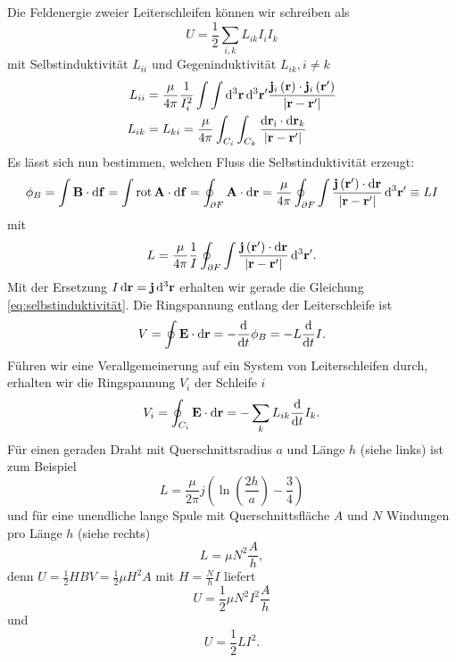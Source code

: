 Die Feldenergie zweier Leiterschleifen können wir schreiben als
\begin{equation*}
	U=\frac{1}{2}\sum _{i,k}L_{ik}I_{i}I_{k}
\end{equation*}
mit Selbstinduktivität $L_{ii}$ und Gegeninduktivität  $L_{ik},i\neq k$
\begin{align}
	\label{eq:selbstinduktivität}
	L_{ii} & =\frac{\mu }{4\pi }\frac{1}{I_{i}^{2}}\int \int \mathop{}\!\mathrm{d} ^{3}\mathbf{r}\mathop{}\!\mathrm{d} ^{3}\mathbf{r}'\frac{\mathbf{j}_{i}\left(\mathbf{r}\right)\cdot \mathbf{j}_{i}\left(\mathbf{r}'\right)}{\left| \mathbf{r}-\mathbf{r}'\right| } \\
	L_{ik} & =L_{ki}=\frac{\mu }{4\pi }\int _{C_{i}}\int _{C_{k}}\frac{\mathop{}\!\mathrm{d} \mathbf{r}_{\mathrm{i}}\cdot \mathop{}\!\mathrm{d} \mathbf{r}_{k}}{\left| \mathbf{r}-\mathbf{r}'\right| }
\end{align}
Es lässt sich nun bestimmen, welchen Fluss die Selbstinduktivität erzeugt:
\begin{equation*}
	\phi _{B}=\int \mathbf{B}\cdot \mathop{}\!\mathrm{d} \mathbf{f}=\int \operatorname{rot} \mathbf{A}\cdot \mathop{}\!\mathrm{d} \mathbf{f}=\oint _{\partial F}\mathbf{A}\cdot \mathop{}\!\mathrm{d} \mathbf{r}=\frac{\mu }{4\pi }\oint _{\partial F}\int \frac{\mathbf{j}\left(\mathbf{r}'\right)\cdot \mathop{}\!\mathrm{d} \mathbf{r}}{\left| \mathbf{r}-\mathbf{r}'\right| }\mathop{}\!\mathrm{d} ^{3}\mathbf{r}'\equiv LI
\end{equation*}
mit
\begin{equation*}
	L=\frac{\mu }{4\pi }\frac{1}{I}\oint _{\partial F}\int \frac{\mathbf{j}\left(\mathbf{r}'\right)\cdot \mathop{}\!\mathrm{d} \mathbf{r}}{\left| \mathbf{r}-\mathbf{r}'\right| }\mathop{}\!\mathrm{d} ^{3}\mathbf{r}'.
\end{equation*}
Mit der Ersetzung $I\mathop{}\!\mathrm{d} \mathbf{r}=\mathbf{j}\mathop{}\!\mathrm{d} ^{3}\mathbf{r}$ erhalten wir gerade die Gleichung \eqref{eq:selbstinduktivität}. Die Ringspannung entlang der Leiterschleife ist
\begin{equation*}
	V=\oint \mathbf{E}\cdot \mathop{}\!\mathrm{d} \mathbf{r}=-\frac{\mathop{}\!\mathrm{d} }{\mathop{}\!\mathrm{d} t}\phi _{B}=-L\frac{\mathop{}\!\mathrm{d} }{\mathop{}\!\mathrm{d} t}I.
\end{equation*}
Führen wir eine Verallgemeinerung auf ein System von Leiterschleifen durch, erhalten wir die Ringspannung $V_{i}$ der Schleife $i$
\begin{equation*}
	V_{i}=\oint _{C_{i}}\mathbf{E}\cdot \mathop{}\!\mathrm{d} \mathbf{r}=-\sum _{k}L_{ik}\frac{\mathop{}\!\mathrm{d} }{\mathop{}\!\mathrm{d} t}I_{k}.
\end{equation*}
Für einen geraden Draht mit Querschnittsradius $a$ und Länge $h$ (siehe  links) ist zum Beispiel
\begin{equation*}
	L=\frac{\mu }{2\pi }j\left(\ln \left(\frac{2h}{a}\right)-\frac{3}{4}\right)
\end{equation*}
und für eine unendliche lange Spule mit Querschnittsfläche $A$ und $N$ Windungen pro Länge $h$ (siehe  rechts) 
\begin{equation*}
	L=\mu N^{2}\frac{A}{h},
\end{equation*}
denn $U=\frac{1}{2}HBV=\frac{1}{2}\mu H^{2}A$ mit $H=\frac{N}{h}I$ liefert
\begin{equation*}
	U=\frac{1}{2}\mu N^{2}I^{2}\frac{A}{h}
\end{equation*}
und
\begin{equation*}
	U=\frac{1}{2}LI^{2}.
\end{equation*}

